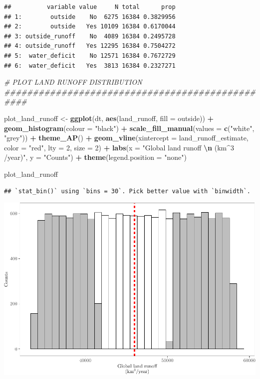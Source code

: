 \documentclass[
  11pt,
]{article}
\newenvironment{Shaded}{\begin{snugshade}}{\end{snugshade}}
\newcommand{\AttributeTok}[1]{\textcolor[rgb]{0.13,0.29,0.53}{#1}}
\newcommand{\CommentTok}[1]{\textcolor[rgb]{0.56,0.35,0.01}{\textit{#1}}}
\newcommand{\DecValTok}[1]{\textcolor[rgb]{0.00,0.00,0.81}{#1}}
\newcommand{\FunctionTok}[1]{\textcolor[rgb]{0.13,0.29,0.53}{\textbf{#1}}}
\newcommand{\NormalTok}[1]{#1}
\newcommand{\OtherTok}[1]{\textcolor[rgb]{0.56,0.35,0.01}{#1}}
\newcommand{\SpecialCharTok}[1]{\textcolor[rgb]{0.81,0.36,0.00}{\textbf{#1}}}
\newcommand{\StringTok}[1]{\textcolor[rgb]{0.31,0.60,0.02}{#1}}
\begin{document}
\begin{verbatim}
##          variable value     N total      prop
## 1:        outside    No  6275 16384 0.3829956
## 2:        outside   Yes 10109 16384 0.6170044
## 3: outside_runoff    No  4089 16384 0.2495728
## 4: outside_runoff   Yes 12295 16384 0.7504272
## 5:  water_deficit    No 12571 16384 0.7672729
## 6:  water_deficit   Yes  3813 16384 0.2327271
\end{verbatim}

\begin{Shaded}
\begin{Highlighting}[]
\CommentTok{\# PLOT LAND RUNOFF DISTRIBUTION \#\#\#\#\#\#\#\#\#\#\#\#\#\#\#\#\#\#\#\#\#\#\#\#\#\#\#\#\#\#\#\#\#\#\#\#\#\#\#\#\#\#\#\#\#\#\#\#}

\NormalTok{plot\_land\_runoff }\OtherTok{\textless{}{-}} \FunctionTok{ggplot}\NormalTok{(dt, }\FunctionTok{aes}\NormalTok{(land\_runoff, }\AttributeTok{fill =}\NormalTok{ outside)) }\SpecialCharTok{+}
  \FunctionTok{geom\_histogram}\NormalTok{(}\AttributeTok{colour =} \StringTok{"black"}\NormalTok{) }\SpecialCharTok{+}
  \FunctionTok{scale\_fill\_manual}\NormalTok{(}\AttributeTok{values =} \FunctionTok{c}\NormalTok{(}\StringTok{"white"}\NormalTok{, }\StringTok{"grey"}\NormalTok{)) }\SpecialCharTok{+}
  \FunctionTok{theme\_AP}\NormalTok{() }\SpecialCharTok{+} 
  \FunctionTok{geom\_vline}\NormalTok{(}\AttributeTok{xintercept =}\NormalTok{ land\_runoff\_estimate, }\AttributeTok{color =} \StringTok{"red"}\NormalTok{, }\AttributeTok{lty =} \DecValTok{2}\NormalTok{, }\AttributeTok{size =} \DecValTok{2}\NormalTok{) }\SpecialCharTok{+}
  \FunctionTok{labs}\NormalTok{(}\AttributeTok{x =} \StringTok{"Global land runoff }\SpecialCharTok{\textbackslash{}n}\StringTok{ (km$\^{}3$/year)"}\NormalTok{, }\AttributeTok{y =} \StringTok{"Counts"}\NormalTok{) }\SpecialCharTok{+}
  \FunctionTok{theme}\NormalTok{(}\AttributeTok{legend.position =} \StringTok{"none"}\NormalTok{)}

\NormalTok{plot\_land\_runoff}
\end{Highlighting}
\end{Shaded}

\begin{verbatim}
## `stat_bin()` using `bins = 30`. Pick better value with `binwidth`.
\end{verbatim}

\includegraphics{code_fallacies_water_crisis_files/figure-latex/rest-1.pdf}
\end{document}
